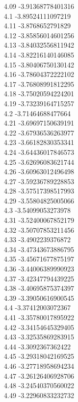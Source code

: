 {4.09	-3.91368778401316\\
4.1	-3.89524111097219\\
4.11	-3.8768652791829\\
4.12	-3.85856014601256\\
4.13	-3.84032556811942\\
4.14	-3.82216140146085\\
4.15	-3.80406750130142\\
4.16	-3.78604372222102\\
4.17	-3.76808991812295\\
4.18	-3.75020594224201\\
4.19	-3.73239164715257\\
4.2	-3.71464688477664\\
4.21	-3.69697150639191\\
4.22	-3.67936536263977\\
4.23	-3.66182830353341\\
4.24	-3.64436017846573\\
4.25	-3.62696083621744\\
4.26	-3.60963012496498\\
4.27	-3.59236789228853\\
4.28	-3.57517398517993\\
4.29	-3.55804825005066\\
4.3	-3.54099053273978\\
4.31	-3.52400067852179\\
4.32	-3.50707853211456\\
4.33	-3.4902239376872\\
4.34	-3.47343673886795\\
4.35	-3.45671677875197\\
4.36	-3.44006389990923\\
4.37	-3.42347794439225\\
4.38	-3.40695875374397\\
4.39	-3.39050616900545\\
4.4	-3.37412003072367\\
4.41	-3.35780017895922\\
4.42	-3.34154645329405\\
4.43	-3.32535869283915\\
4.44	-3.3092367362422\\
4.45	-3.29318042169525\\
4.46	-3.27718958694234\\
4.47	-3.26126406928706\\
4.48	-3.24540370560022\\
4.49	-3.22960833232732\\
}
